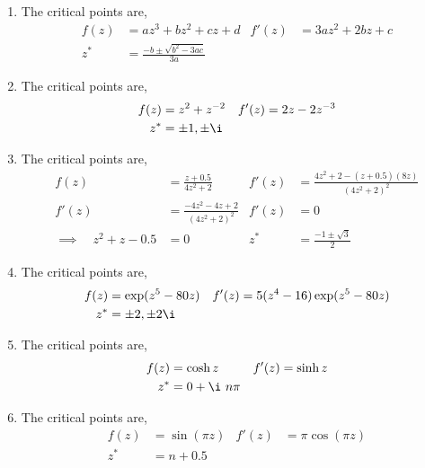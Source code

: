\begin{enumerate}
    \item The critical points are,
          \begin{align}
              f(z)  & = az^3 + bz^2 + cz + d               &
              f'(z) & = 3az^2 + 2bz + c                      \\
              z^*   & = \frac{-b \pm \sqrt{b^2 - 3ac}}{3a}
          \end{align}

    \item The critical points are,
          \begin{align}
              f(z)  & = z^2 + z^{-2}  &
              f'(z) & = 2z - 2z^{-3}    \\
              z^*   & = \pm 1, \pm \i
          \end{align}

    \item The critical points are,
          \begin{align}
              f(z)  & = \frac{z+ 0.5}{4z^2 + 2}                       &
              f'(z) & = \frac{4z^2 + 2 - (z + 0.5)(8z)}{(4z^2 + 2)^2}   \\
              f'(z) & = \frac{-4z^2 - 4z + 2}{(4z^2 + 2)^2}           &
              f'(z) & = 0                                               \\
              \implies \quad z^2 + z - 0.5
                    & = 0                                             &
              z^*   & = \frac{-1 \pm \sqrt{3}}{2}
          \end{align}

    \item The critical points are,
          \begin{align}
              f(z)  & = \exp(z^5 - 80z)            &
              f'(z) & = 5(z^4 - 16)\exp(z^5 - 80z)   \\
              z^*   & = \pm 2, \pm 2\i
          \end{align}

    \item The critical points are,
          \begin{align}
              f(z)  & = \cosh z      &
              f'(z) & = \sinh z        \\
              z^*   & = 0 + \i\ n\pi
          \end{align}

    \item The critical points are,
          \begin{align}
              f(z)  & = \sin(\pi z)     &
              f'(z) & = \pi \cos(\pi z)   \\
              z^*   & = n + 0.5
          \end{align}


\end{enumerate}
